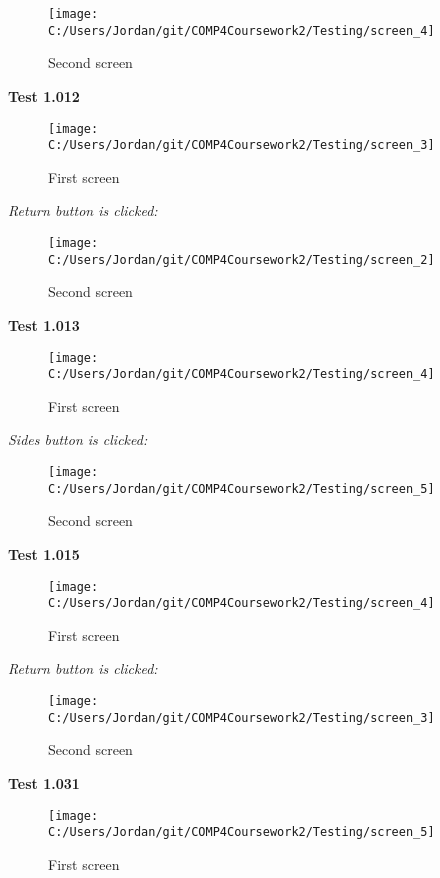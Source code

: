 \begin{figure}[H]
    \label{fig: Second Screen}\caption{Second screen}
    \texttt{[image: C:/Users/Jordan/git/COMP4Coursework2/Testing/screen\_4]}
\end{figure}

\textbf{Test 1.012}

\begin{figure}[H]
    \label{fig: First Screen}\caption{First screen}
    \texttt{[image: C:/Users/Jordan/git/COMP4Coursework2/Testing/screen\_3]}
\end{figure}

\textit{Return button is clicked: }

\begin{figure}[H]
    \label{fig: Second Screen}\caption{Second screen}
    \texttt{[image: C:/Users/Jordan/git/COMP4Coursework2/Testing/screen\_2]}
\end{figure}

\textbf{Test 1.013}

\begin{figure}[H]
    \label{fig: First Screen}\caption{First screen}
    \texttt{[image: C:/Users/Jordan/git/COMP4Coursework2/Testing/screen\_4]}
\end{figure}

\textit{Sides button is clicked: }

\begin{figure}[H]
    \label{fig: Second Screen}\caption{Second screen}
    \texttt{[image: C:/Users/Jordan/git/COMP4Coursework2/Testing/screen\_5]}
\end{figure}

\textbf{Test 1.015}

\begin{figure}[H]
    \label{fig: First Screen}\caption{First screen}
    \texttt{[image: C:/Users/Jordan/git/COMP4Coursework2/Testing/screen\_4]}
\end{figure}

\textit{Return button is clicked: }

\begin{figure}[H]
    \label{fig: Second Screen}\caption{Second screen}
    \texttt{[image: C:/Users/Jordan/git/COMP4Coursework2/Testing/screen\_3]}
\end{figure}

\textbf{Test 1.031}

\begin{figure}[H]
    \label{fig: First Screen}\caption{First screen}
    \texttt{[image: C:/Users/Jordan/git/COMP4Coursework2/Testing/screen\_5]}
\end{figure}

